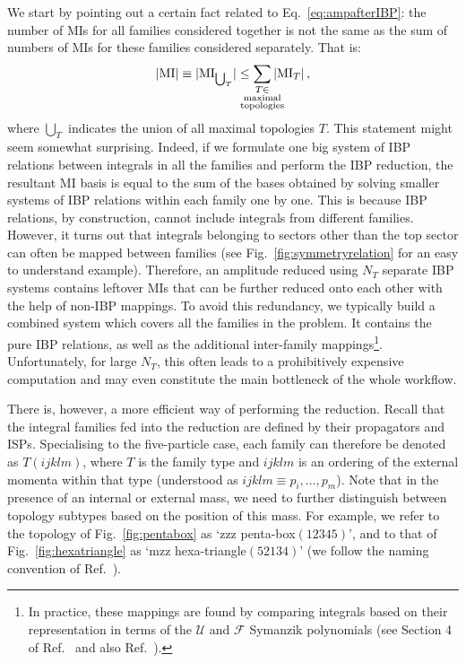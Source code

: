 \documentclass[main.tex]{subfiles}
\begin{document}
We start by pointing out a certain fact related to Eq.~\ref{eq:ampafterIBP}: the number of MIs for all families considered together is not the same as the sum of numbers of MIs for these families considered separately. That is:
\begin{equation} \label{eq:noofmis}
    |\text{MI}| \equiv |\text{MI}_{\bigcup_T}| \le \sum_{\mathclap{\substack{T \in \\ \text{maximal} \\ \text{topologies}}}} |\text{MI}_T| \,,
\end{equation}
where $\bigcup_T$ indicates the union of all maximal topologies $T$. This statement might seem somewhat surprising. Indeed, if we formulate one big system of IBP relations between integrals in all the families and perform the IBP reduction, the resultant MI basis is equal to the sum of the bases obtained by solving smaller systems of IBP relations within each family one by one. This is because IBP relations, by construction, cannot include integrals from different families. However, it turns out that integrals belonging to sectors other than the top sector can often be mapped between families (see  Fig.~\ref{fig:symmetryrelation} for an easy to understand example). Therefore, an amplitude reduced using $N_T$ separate IBP systems contains leftover MIs that can be further reduced onto each other with the help of non-IBP mappings. To avoid this redundancy, we typically build a combined system which covers all the families in the problem. It contains the pure IBP relations, as well as the additional inter-family mappings\footnote{In practice, these mappings are found by comparing integrals based on their representation in terms of the $\mathcal{U}$ and $\mathcal{F}$ Symanzik polynomials (see Section 4 of Ref.~\cite{Lee:2012cn} and also Ref.~\cite{Pak:2011xt}).}. Unfortunately, for large $N_T$, this often leads to a prohibitively expensive computation and may even constitute the main bottleneck of the whole workflow.

There is, however, a more efficient way of performing the reduction. Recall that the integral families fed into the reduction are defined by their propagators and ISPs. Specialising to the five-particle case, each family can therefore be denoted as $T(ijklm)$, where $T$ is the family type and $ijklm$ is an ordering of the external momenta within that type (understood as $ijklm \equiv p_i,\ldots, p_m$). Note that in the presence of an internal or external mass, we need to further distinguish between topology subtypes based on the position of this mass. For example, we refer to the topology of Fig.~\ref{fig:pentabox} as `zzz penta-box$(12345)$', and to that of Fig.~\ref{fig:hexatriangle} as `mzz hexa-triangle$(52134)$' (we follow the naming convention of Ref.~\cite{Abreu:2020jxa}).
\end{document}
